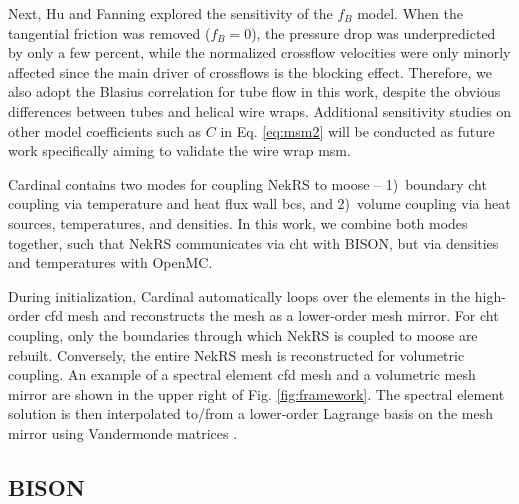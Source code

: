 \documentclass[3p,,preprint,11pt]{elsarticle}
\begin{document}
Next, Hu and Fanning explored the sensitivity of the $f_B$ model. When the tangential friction
was removed ($f_B=0$), the pressure drop was underpredicted by only a few percent, while the normalized crossflow velocities
were only minorly affected since the main driver of crossflows is the blocking effect. Therefore, we also adopt the Blasius correlation for tube flow in this work, despite the
obvious differences between tubes and helical wire wraps. Additional sensitivity studies on other model coefficients such as $C$ in Eq. \eqref{eq:msm2} will be conducted as future work specifically aiming to validate the wire wrap \gls{msm}. 



Cardinal contains two modes for coupling NekRS to \gls{moose} -- 1)~boundary \gls{cht} coupling via temperature and heat flux wall \glspl{bc}, and 2)~volume coupling via heat sources, temperatures, and densities. In this work, we combine both modes together, such that NekRS communicates via \gls{cht} with BISON, but via densities and temperatures with OpenMC. 

During initialization, Cardinal automatically loops over the elements in the high-order \gls{cfd} mesh and reconstructs the mesh as a lower-order mesh mirror. For \gls{cht} coupling, only the boundaries through which NekRS is coupled to \gls{moose} are rebuilt. Conversely, the entire NekRS mesh is reconstructed for volumetric coupling. An example of a spectral element \gls{cfd} mesh and a volumetric mesh mirror are shown in the upper right of Fig. \ref{fig:framework}. The spectral element solution is then interpolated to/from a lower-order Lagrange basis on the mesh mirror using Vandermonde matrices \cite{novak2022_cardinal}.

\subsection{BISON}
\label{sec:bison}
\end{document}
